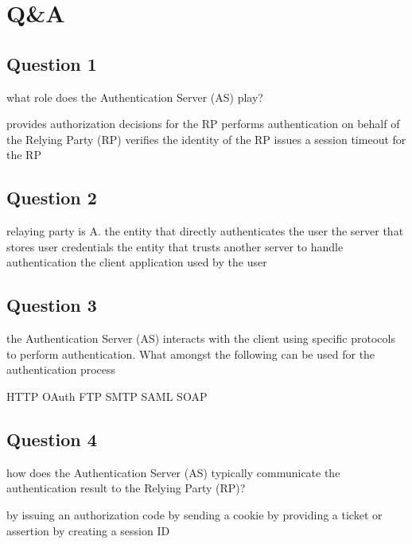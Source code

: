 \section{Q\&A}
\subsection*{Question 1}
what role does the Authentication Server (AS) play?
\begin{itemize}
  \incorrect provides authorization decisions for the RP
  \correct performs authentication on behalf of the Relying Party (RP)
  \incorrect verifies the identity of the RP
  \incorrect issues a session timeout for the RP
\end{itemize}

\subsection*{Question 2}
\begin{itemize}
  \incorrect relaying party is A. the entity that directly authenticates the user 
  \incorrect  the server that stores user credentials
  \correct  the entity that trusts another server to handle authentication
  \incorrect  the client application used by the user
\end{itemize}

\subsection*{Question 3}
the Authentication Server (AS) interacts with the client using
specific protocols to perform authentication. What amongst the
following can be used for the authentication process
\begin{itemize}
  \incorrect HTTP 
  \correct OAuth 
  \incorrect FTP
  \incorrect SMTP 
  \correct SAML 
  \incorrect SOAP
\end{itemize}

\subsection*{Question 4}
how does the Authentication Server (AS) typically
communicate the authentication result to the Relying Party (RP)?
\begin{itemize}
  \incorrect  by issuing an authorization code 
  \incorrect  by sending a cookie
  \correct  by providing a ticket or assertion 
  \incorrect  by creating a session ID
\end{itemize}

